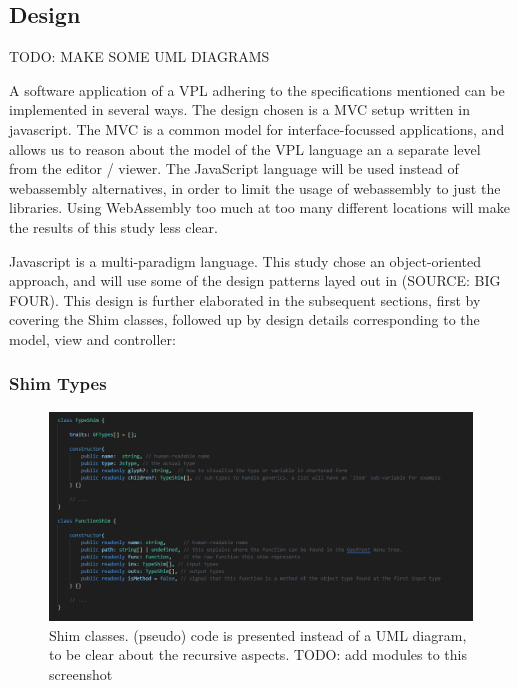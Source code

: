 \subsection{Design}

\begin{note}
  TODO: MAKE SOME UML DIAGRAMS
\end{note}

A software application of a VPL adhering to the specifications mentioned can be implemented in several ways. 
The design chosen is a \ac{MVC} setup written in javascript.  
The \ac{MVC} is a common model for interface-focussed applications, and allows us to reason about the model of the VPL language an a separate level from the editor / viewer.
The JavaScript language will be used instead of webassembly alternatives, in order to limit the usage of webassembly to just the libraries. 
Using WebAssembly too much at too many different locations will make the results of this study less clear.

Javascript is a multi-paradigm language.
This study chose an object-oriented approach, and will use some of the design patterns layed out in (SOURCE: BIG FOUR).
This design is further elaborated in the subsequent sections, first by covering the Shim classes, followed up by design details corresponding to the model, view and controller:

\subsubsection*{Shim Types}

\begin{figure}
  \centering
  \graphicspath{ {../../assets/images/implementation/} }
  \includegraphics[width=\linewidth]{shim-uml.png}
  \caption[Shim Classes]{Shim classes. (pseudo) code is presented instead of a UML diagram, to be clear about the recursive aspects. TODO: add modules to this screenshot }
  \label{fig:shim-classes}
\end{figure}

